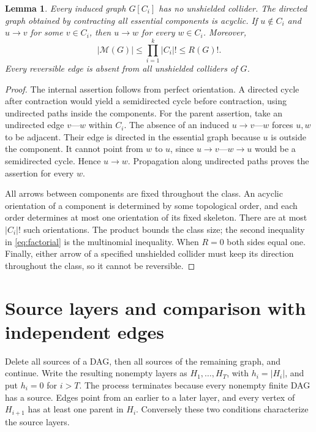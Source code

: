 \documentclass[11pt]{article}
\newtheorem{lemma}[theorem]{Lemma}
\theoremstyle{remark}
\newcommand{\M}{\mathcal M}
\begin{document}
\begin{lemma}\label{lem:components}
Every induced graph $G[C_i]$ has no unshielded collider. The directed graph
obtained by contracting all essential components is acyclic. If $u\notin C_i$
and $u\to v$ for some $v\in C_i$, then $u\to w$ for every $w\in C_i$.
Moreover,
\begin{equation}\label{eq:factorial}
 |\M(G)|\le\prod_{i=1}^k |C_i|!\le R(G)!.
\end{equation}
Every reversible edge is absent from all unshielded colliders of $G$.
\end{lemma}
\begin{proof}
The internal assertion follows from perfect orientation. A directed cycle
after contraction would yield a semidirected cycle before contraction, using
undirected paths inside the components.
For the parent assertion, take an undirected edge $v\text{---}w$ within $C_i$.
The absence of an induced $u\to v\text{---}w$ forces $u,w$ to be adjacent.
Their edge is directed in the essential graph because $u$ is outside the
component. It cannot point from $w$ to $u$, since
$u\to v\text{---}w\to u$ would be a semidirected cycle. Hence $u\to w$.
Propagation along undirected paths proves the assertion for every $w$.

All arrows between components are fixed throughout the class. An acyclic
orientation of a component is determined by some topological order, and each
order determines at most one orientation of its fixed skeleton. There are at
most $|C_i|!$ such orientations. The product bounds the class size; the second
inequality in \eqref{eq:factorial} is the multinomial inequality. When $R=0$
both sides equal one. Finally, either arrow of a specified unshielded collider
must keep its direction throughout the class, so it cannot be reversible.
\end{proof}

\section{Source layers and comparison with independent edges}
Delete all sources of a DAG, then all sources of the remaining graph, and
continue. Write the resulting nonempty layers as $H_1,\ldots,H_T$, with
$h_i=|H_i|$, and put $h_i=0$ for $i>T$. The process terminates because every
nonempty finite DAG has a source. Edges point from an earlier to a later
layer, and every vertex of $H_{i+1}$ has at least one parent in $H_i$.
Conversely these two conditions characterize the source layers.
\end{document}
